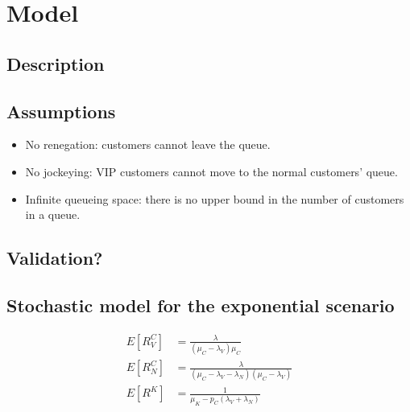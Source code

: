 \section{Model}

\subsection{Description}

\subsection{Assumptions}
\begin{itemize}
    \item No renegation: customers cannot leave the queue.
    \item No jockeying: VIP customers cannot move to the normal customers' queue.
    \item Infinite queueing space: there is no upper bound in the number of 
        customers in a queue.
\end{itemize}

\subsection{Validation?}

\subsection{Stochastic model for the exponential scenario}
\begin{align}
    E[R^C_{V}] &= \frac{\lambda}{(\mu_C-\lambda_{V})\mu_C} \\
    E[R^C_{N}] &= \frac{\lambda}{(\mu_C-\lambda_{V}-\lambda_N)(\mu_C-\lambda_{V})} \\
    E[R^K] &= \frac{1}{\mu_K-p_C(\lambda_{V}+\lambda_{N})}
\end{align}
